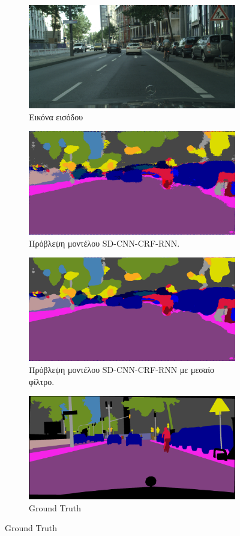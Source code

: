 \begin{figure}[H]
 \centering
 \begin{subfigure}[b]{\linewidth}
  \centering
  \includegraphics[width=0.67\linewidth]{Images/Original_frankfurt_000000_015676_leftImg8bit}
  \caption{\textgreek{Εικόνα εισόδου}}
  \end{subfigure}
 
 \begin{subfigure}[b]{\linewidth}
  \centering
  \includegraphics[width=0.67\linewidth]{Images/frankfurt_000000_015676_leftImg8bit_7_10_1024}
  \caption{\textgreek{Πρόβλεψη μοντέλου }SD-CNN-CRF-RNN.}
 \end{subfigure}
  
 \begin{subfigure}[b]{\linewidth}
  \centering
  \includegraphics[width=0.67\linewidth]{Images/frankfurt_000000_015676_leftImg8bit_median_7_10_1024}
  \caption{\textgreek{Πρόβλεψη μοντέλου }SD-CNN-CRF-RNN \textgreek{με μεσαίο φίλτρο}.}
 \end{subfigure}
  
 \begin{subfigure}[b]{\linewidth}
  \centering
  \includegraphics[width=0.67\linewidth]{Images/frankfurt_000000_015676_gtFine_color}
  \caption{Ground Truth}
 \end{subfigure}
  

\end{figure}
